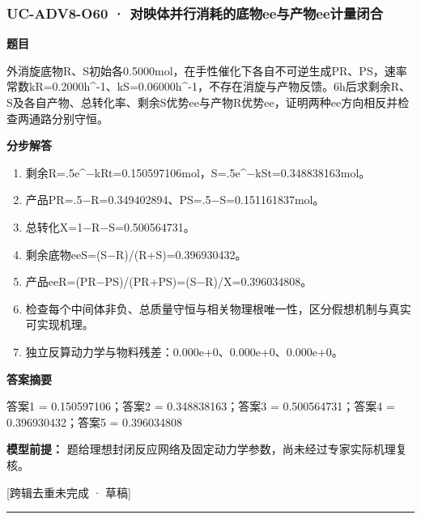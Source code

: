 \documentclass[UTF8,11pt,a4paper]{ctexart}
\begin{document}
\subsubsection*{UC-ADV8-O60 · 对映体并行消耗的底物ee与产物ee计量闭合}
\noindent\textbf{题目}\par
外消旋底物R、S初始各0.5000mol，在手性催化下各自不可逆生成PR、PS，速率常数kR=0.2000h\textasciicircum{}-1、kS=0.06000h\textasciicircum{}-1，不存在消旋与产物反馈。6h后求剩余R、S及各自产物、总转化率、剩余S优势ee与产物R优势ee，证明两种ee方向相反并检查两通路分别守恒。\par
\medskip\noindent\textbf{分步解答}
\begin{enumerate}
\item 剩余R=.5e\textasciicircum{}−kRt=0.150597106mol，S=.5e\textasciicircum{}−kSt=0.348838163mol。
\item 产品PR=.5−R=0.349402894、PS=.5−S=0.151161837mol。
\item 总转化X=1−R−S=0.500564731。
\item 剩余底物eeS=(S−R)/(R+S)=0.396930432。
\item 产品eeR=(PR−PS)/(PR+PS)=(S−R)/X=0.396034808。
\item 检查每个中间体非负、总质量守恒与相关物理根唯一性，区分假想机制与真实可实现机理。
\item 独立反算动力学与物料残差：0.000e+0、0.000e+0、0.000e+0。
\end{enumerate}
\noindent\textbf{答案摘要}\par
答案1 = 0.150597106；答案2 = 0.348838163；答案3 = 0.500564731；答案4 = 0.396930432；答案5 = 0.396034808\par
\noindent\textbf{模型前提：}
题给理想封闭反应网络及固定动力学参数，尚未经过专家实际机理复核。\par
\noindent\textcolor{red!65!black}{[跨辑去重未完成 · 草稿]} \par
\medskip\hrule\medskip
{}
\end{document}
